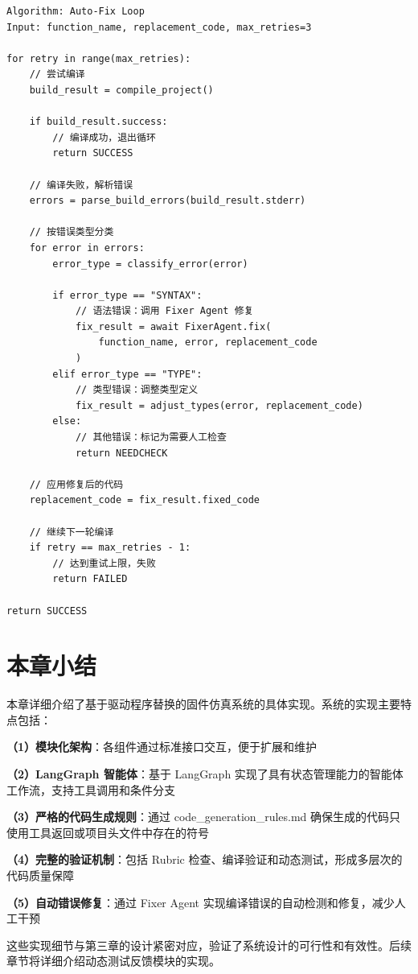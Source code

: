\begin{lstlisting}[style=Python,abovecaptionskip=0pt,belowcaptionskip=0pt]
Algorithm: Auto-Fix Loop
Input: function_name, replacement_code, max_retries=3

for retry in range(max_retries):
    // 尝试编译
    build_result = compile_project()
    
    if build_result.success:
        // 编译成功，退出循环
        return SUCCESS
    
    // 编译失败，解析错误
    errors = parse_build_errors(build_result.stderr)
    
    // 按错误类型分类
    for error in errors:
        error_type = classify_error(error)
        
        if error_type == "SYNTAX":
            // 语法错误：调用 Fixer Agent 修复
            fix_result = await FixerAgent.fix(
                function_name, error, replacement_code
            )
        elif error_type == "TYPE":
            // 类型错误：调整类型定义
            fix_result = adjust_types(error, replacement_code)
        else:
            // 其他错误：标记为需要人工检查
            return NEEDCHECK
    
    // 应用修复后的代码
    replacement_code = fix_result.fixed_code
    
    // 继续下一轮编译
    if retry == max_retries - 1:
        // 达到重试上限，失败
        return FAILED

return SUCCESS
\end{lstlisting}

\section{本章小结}
\label{sec:implementation_summary}

本章详细介绍了基于驱动程序替换的固件仿真系统的具体实现。系统的实现主要特点包括：

\textbf{（1）模块化架构}：各组件通过标准接口交互，便于扩展和维护

\textbf{（2）LangGraph 智能体}：基于 LangGraph 实现了具有状态管理能力的智能体工作流，支持工具调用和条件分支

\textbf{（3）严格的代码生成规则}：通过 code\_generation\_rules.md 确保生成的代码只使用工具返回或项目头文件中存在的符号

\textbf{（4）完整的验证机制}：包括 Rubric 检查、编译验证和动态测试，形成多层次的代码质量保障

\textbf{（5）自动错误修复}：通过 Fixer Agent 实现编译错误的自动检测和修复，减少人工干预

这些实现细节与第三章的设计紧密对应，验证了系统设计的可行性和有效性。后续章节将详细介绍动态测试反馈模块的实现。
